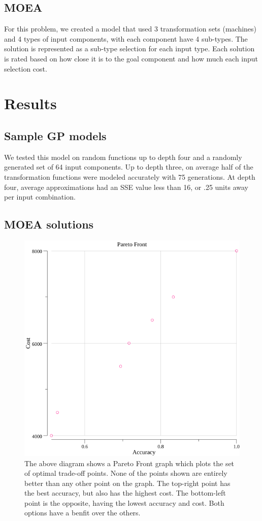 \documentclass{IEEEtran}
\begin{document}
\subsection{MOEA}
For this problem, we created a model that used 3 transformation sets (machines) and 4 types of input components, with each component have 4 sub-types. The solution is represented as a sub-type selection for each input type. Each solution is rated based on how close it is to the goal component and how much each input selection cost.

\section{Results}
\subsection{Sample GP models}
We tested this model on random functions up to depth four and a randomly generated set of 64 input components. Up to depth three, on average half of the transformation functions were modeled accurately with 75 generations. At depth four, average approximations had an SSE value less than 16, or .25 units away per input combination.

\subsection{MOEA solutions}
\begin{figure}[!t]
\centerline{\includegraphics[width=\columnwidth]{points.png}}
\caption{The above diagram shows a Pareto Front graph which plots the set of optimal trade-off points. None of the points shown are entirely better than any other point on the graph. The top-right point has the best accuracy, but also has the highest cost. The bottom-left point is the opposite, having the lowest accuracy and cost. Both options have a benfit over the others.}
\end{figure}
\end{document}
